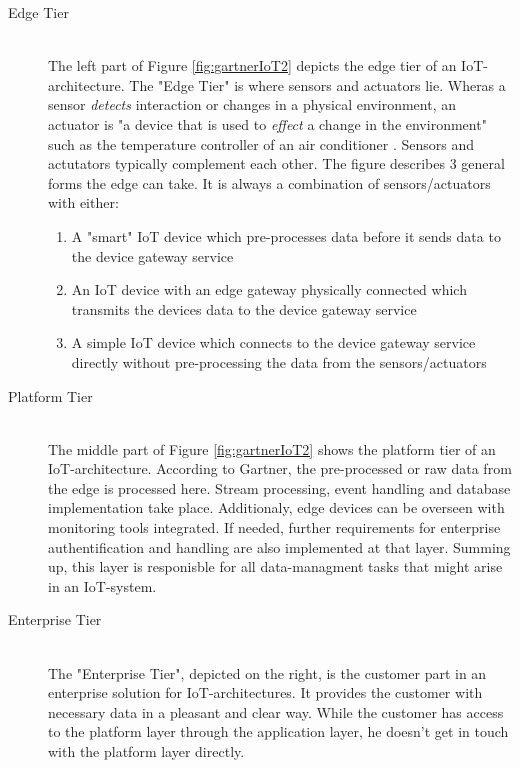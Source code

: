 \begin{description}
    \item[Edge Tier]\hfill \\ 
    The left part of Figure \ref{fig:gartnerIoT2} depicts the edge tier of an IoT-architecture.
    The "Edge Tier" is where sensors and actuators lie.
    Wheras a sensor \textit{detects} interaction or changes in a physical environment, an actuator is
    "a device that is used to \textit{effect} a change in the environment" such as the temperature 
    controller of an air conditioner \parencite{archsurv4}. 
    Sensors and actutators typically complement each other.
    The figure describes 3 general forms the edge can take. 
    It is always a combination of sensors/actuators with either:
    \begin{enumerate}
        \item A "smart" IoT device which pre-processes data before it sends data to the device gateway service
        \item An IoT device with an edge gateway physically connected which transmits the devices data to the device gateway service
        \item A simple IoT device which connects to the device gateway service directly without pre-processing the data from the sensors/actuators
    \end{enumerate}
    
    \item [Platform Tier] \hfill \\
    The middle part of Figure \ref{fig:gartnerIoT2} shows the platform tier of an IoT-architecture.
    According to Gartner, the pre-processed or raw data from the edge is processed here. %
    Stream processing, event handling and database implementation take place.
    Additionaly, edge devices can be overseen with monitoring tools integrated. 
    If needed, further requirements for enterprise authentification and handling are also implemented at that layer.
    Summing up, this layer is responisble for all data-managment tasks that might arise in an IoT-system.


    \item [Enterprise Tier] \hfill \\
    The "Enterprise Tier", depicted on the right, is the customer part in an enterprise solution for IoT-architectures.
    It provides the customer with necessary data in a pleasant and clear way.
    While the customer has access to the platform layer through the application layer, he doesn't get in touch with the platform layer directly.  %
\end{description}

